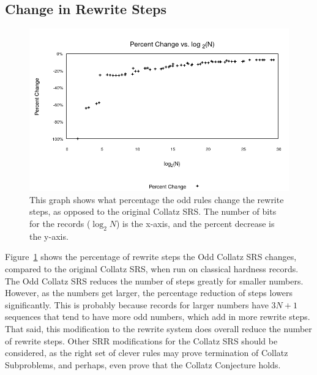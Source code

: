 \subsection{Change in Rewrite Steps}
\begin{figure}
    \centering
    \includegraphics[scale=0.75]{ModAvoidanceAnalysisPics/Percent_Change.png}
    \caption{This graph shows what percentage the odd rules change the rewrite steps, as opposed to the original Collatz SRS. The number of bits for the records ($\log_2{N}$) is the x-axis, and the percent decrease is the y-axis.}
    \label{fig:percent_decrease}
\end{figure}
Figure~\ref{fig:percent_decrease} shows the percentage of rewrite steps the Odd Collatz SRS changes, compared to the original Collatz SRS, when run on classical hardness records. The Odd Collatz SRS reduces the number of steps greatly for smaller numbers. However, as the numbers get larger, the percentage reduction of steps lowers significantly. This is probably because records for larger numbers have $3N+1$ sequences that tend to have more odd numbers, which add in more rewrite steps. That said, this modification to the rewrite system does overall reduce the number of rewrite steps. Other SRR modifications for the Collatz SRS should be considered, as the right set of clever rules may prove termination of Collatz Subproblems, and perhaps, even prove that the Collatz Conjecture holds.



